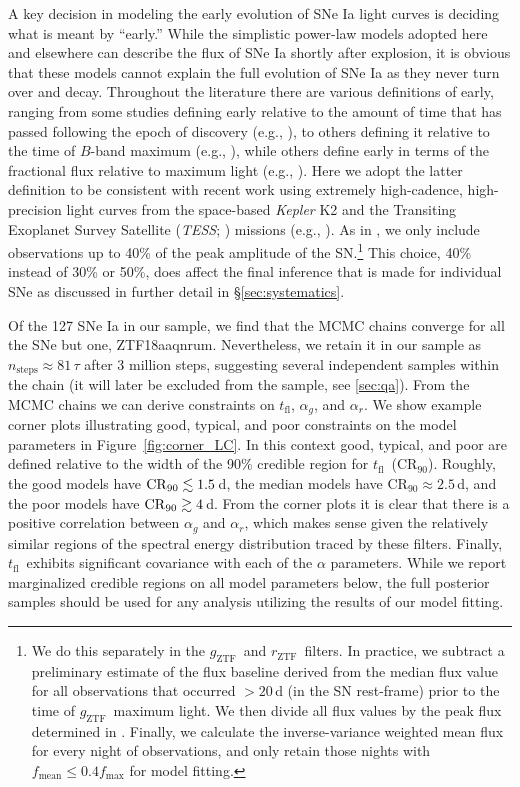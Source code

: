 \documentclass[twocolumn]{./aastex63}
\newcommand{\rztf}{$r_\mathrm{ZTF}$}
\newcommand{\gztf}{$g_\mathrm{ZTF}$}
\newcommand{\tfl}{$t_\mathrm{fl}$}
\begin{document}
A key decision in modeling the early evolution of SNe Ia light curves is
deciding what is meant by ``early.'' While the simplistic power-law models
adopted here and elsewhere can describe the flux of SNe Ia shortly after
explosion, it is obvious that these models cannot explain the full evolution
of SNe Ia as they never turn over and decay. Throughout the literature there
are various definitions of early, ranging from some studies defining early
relative to the amount of time that has passed following the epoch of
discovery (e.g., \citealt{Zheng13,Miller18}), to others defining it relative
to the time of $B$-band maximum (e.g., \citealt{Riess99a,Conley06}), while
others define early in terms of the fractional flux relative to maximum light
(e.g., \citealt{Olling15,Firth15,Fausnaugh19}). Here we adopt the latter
definition to be consistent with recent work using extremely high-cadence,
high-precision light curves from the space-based \textit{Kepler} K2
\citep{Howell14} and the Transiting Exoplanet Survey Satellite (\textit{TESS};
\citealt{Ricker15}) missions (e.g., \citealt{Olling15,Fausnaugh19}). As in
\citet{Olling15}, we only include observations up to 40\% of the peak
amplitude of the SN.\footnote{We do this separately in the \gztf\ and \rztf\
filters. In practice, we subtract a preliminary estimate of the flux baseline
derived from the median flux value for all observations that occurred $>20$\,d
(in the SN rest-frame) prior to the time of \gztf\ maximum light. We then
divide all flux values by the peak flux determined in \citet{Yao19}. Finally,
we calculate the inverse-variance weighted mean flux for every night of
observations, and only retain those nights with $f_\mathrm{mean} \le 0.4
f_\mathrm{max}$ for model fitting.} This choice, 40\% instead of 30\% or
50\%, does affect the final inference that is made for individual SNe as
discussed in further detail in \S\ref{sec:systematics}.

Of the 127 SNe Ia in our sample, we find that the MCMC chains converge for
all the SNe but one, ZTF18aaqnrum. Nevertheless, we retain it in our sample
as $n_\mathrm{steps} \approx 81 \,\tau$ after 3 million steps, suggesting
several independent samples within the chain (it will later be excluded from
the sample, see \ref{sec:qa}). From the MCMC chains we can derive
constraints on \tfl, $\alpha_g$, and $\alpha_r$. We show example corner plots
illustrating good, typical, and poor constraints on the model parameters in
Figure~\ref{fig:corner_LC}. In this context good, typical, and poor are
defined relative to the width of the 90\% credible region for \tfl\
($\mathrm{CR}_{90}$). Roughly, the good models have $\mathrm{CR}_{90} \lesssim
1.5$\,d, the median models have $\mathrm{CR}_{90} \approx 2.5$\,d, and the
poor models have $\mathrm{CR}_{90} \gtrsim 4$\,d. From the corner plots it is
clear that there is a positive correlation between $\alpha_g$ and $\alpha_r$,
which makes sense given the relatively similar regions of the spectral energy
distribution traced by these filters. Finally, \tfl\ exhibits significant
covariance with each of the $\alpha$ parameters. While we report marginalized
credible regions on all model parameters below, the full posterior samples
should be used for any analysis utilizing the results of our model fitting. 
\end{document}
